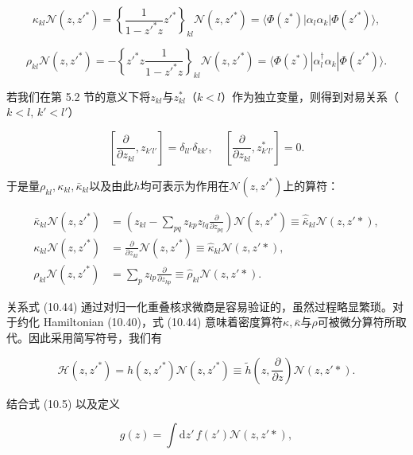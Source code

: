 \begin{equation}
\kappa_{kl}\mathscr{N}(z,z'^{*})=\left\{ \frac{1}{1-z'^{*}z}z'^{*}\right\} _{kl}\mathscr{N}(z,z'^{*})=\langle\Phi(z^{*})|\alpha_{l}\alpha_{k}|\Phi(z'^{*})\rangle,\label{eq:gcm_kappa_def}
\end{equation}

\begin{equation}
\rho_{kl}\mathscr{N}(z,z'^{*})=-\left\{ z'^{*}z\frac{1}{1-z'^{*}z}\right\} _{kl}\mathscr{N}(z,z'^{*})=\langle\Phi(z^{*})|\alpha^{\dagger}_{l}\alpha_{k}|\Phi(z'^{*})\rangle.\label{eq:gcm_rho_def}
\end{equation}

若我们在第 5.2 节的意义下将$z_{kl}$与$z^{*}_{kl}$（$k<l$）作为独立变量，则得到对易关系（$k<l,\,k'<l'$）

\[
\left[\frac{\partial}{\partial z_{kl}},z_{k'l'}\right]=\delta_{ll'}\delta_{kk'},\quad\left[\frac{\partial}{\partial z_{kl}},z^{*}_{k'l'}\right]=0.
\]

于是量$\rho_{kl},\kappa_{kl},\bar{\kappa}_{kl}$以及由此$h$均可表示为作用在$\mathscr{N}(z,z'^{*})$上的算符：

\begin{align}
\bar{\kappa}_{kl}\mathscr{N}(z,z'^{*}) & =\left(z_{kl}-\sum_{pq}z_{kp}z_{lq}\frac{\partial}{\partial z_{pq}}\right)\mathscr{N}(z,z'^{*})\equiv\hat{\bar{\kappa}}_{kl}\mathscr{N}(z,z'*),\nonumber \\
\kappa_{kl}\mathscr{N}(z,z'^{*}) & =\frac{\partial}{\partial z_{kl}}\mathscr{N}(z,z'^{*})\equiv\hat{\kappa}_{kl}\mathscr{N}(z,z'*),\label{eq:gcm_differential_ops}\\
\rho_{kl}\mathscr{N}(z,z'^{*}) & =\sum_{p}z_{lp}\frac{\partial}{\partial z_{kp}}\equiv\hat{\rho}_{kl}\mathscr{N}(z,z'*).\nonumber 
\end{align}

关系式 (10.44) 通过对归一化重叠核求微商是容易验证的，虽然过程略显繁琐。对于约化 Hamiltonian (10.40)，式
(10.44) 意味着密度算符$\kappa,\bar{\kappa}$与$\rho$可被微分算符所取代。因此采用简写符号，我们有

\begin{equation}
\mathscr{H}(z,z'^{*})=h(z,z'^{*})\mathscr{N}(z,z'^{*})\equiv\tilde{h}\left(z,\frac{\partial}{\partial z}\right)\mathscr{N}(z,z'*).\label{eq:gcm_h_tilde_diff}
\end{equation}

结合式 (10.5) 以及定义

\begin{equation}
g(z)=\int\mathrm{d}z'\,f(z')\mathscr{N}(z,z'*),\label{eq:gcm_gz_def}
\end{equation}

